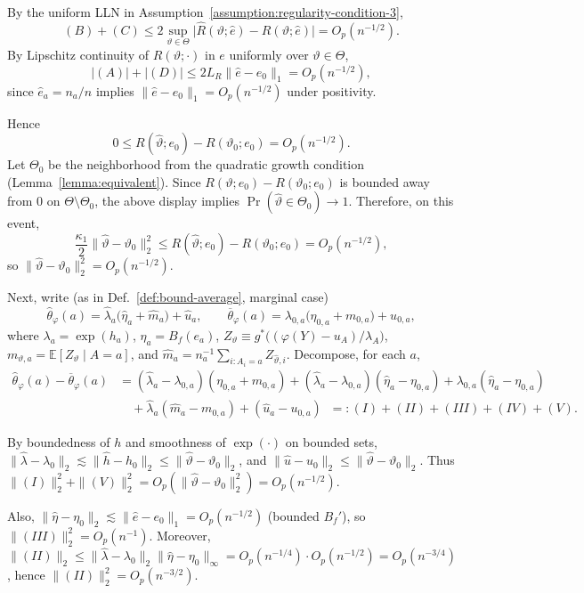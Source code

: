 By the uniform LLN in Assumption~\ref{assumption:regularity-condition-3},
\[
(B)+(C) \le 2\sup_{\vartheta\in\Theta}\big|\widehat R(\vartheta;\widehat e)-R(\vartheta;\widehat e)\big|
= O_p(n^{-1/2}).
\]
By Lipschitz continuity of $R(\vartheta;\cdot)$ in $e$ uniformly over $\vartheta\in\Theta$,
\[
|(A)|+|(D)|
\le 2L_R\|\widehat e-e_0\|_1
= O_p(n^{-1/2}),
\]
since $\widehat e_a=n_a/n$ implies $\|\widehat e-e_0\|_1=O_p(n^{-1/2})$ under positivity.

Hence
\[
0 \le R(\widehat\vartheta;e_0)-R(\vartheta_0;e_0)=O_p(n^{-1/2}).
\]
Let $\Theta_0$ be the neighborhood from the quadratic growth condition (Lemma~\ref{lemma:equivalent}).
Since $R(\vartheta;e_0)-R(\vartheta_0;e_0)$ is bounded away from $0$ on $\Theta\setminus\Theta_0$,
the above display implies $\Pr(\widehat\vartheta\in\Theta_0)\to 1$. Therefore, on this event,
\[
\frac{\kappa_1}{2}\|\widehat\vartheta-\vartheta_0\|_2^2
\le R(\widehat\vartheta;e_0)-R(\vartheta_0;e_0)
= O_p(n^{-1/2}),
\]
so $\|\widehat\vartheta-\vartheta_0\|_2^2=O_p(n^{-1/2})$.

Next, write (as in Def.~\ref{def:bound-average}, marginal case)
\[
\widehat\theta_\varphi(a)=\widehat\lambda_a\big(\widehat\eta_a+\widehat m_a\big)+\widehat u_a,
\qquad
\overline\theta_\varphi(a)=\lambda_{0,a}\big(\eta_{0,a}+m_{0,a}\big)+u_{0,a},
\]
where $\lambda_a=\exp(h_a)$, $\eta_a=B_f(e_a)$,
$Z_\vartheta \equiv g^\ast\!\big((\varphi(Y)-u_A)/\lambda_A\big)$,
$m_{\vartheta,a}=\mathbb E[Z_\vartheta\mid A=a]$, and $\widehat m_a=n_a^{-1}\sum_{i:A_i=a} Z_{\widehat\vartheta,i}$.
Decompose, for each $a$,
\begin{align*}
\widehat\theta_\varphi(a)-\overline\theta_\varphi(a)
&= (\widehat\lambda_a-\lambda_{0,a})(\eta_{0,a}+m_{0,a})
+(\widehat\lambda_a-\lambda_{0,a})(\widehat\eta_a-\eta_{0,a})
+\lambda_{0,a}(\widehat\eta_a-\eta_{0,a}) \\
&\quad+\widehat\lambda_a(\widehat m_a-m_{0,a})
+(\widehat u_a-u_{0,a})
\;\;=:(I)+(II)+(III)+(IV)+(V).
\end{align*}

By boundedness of $h$ and smoothness of $\exp(\cdot)$ on bounded sets,
$\|\widehat\lambda-\lambda_0\|_2 \lesssim \|\widehat h-h_0\|_2\le\|\widehat\vartheta-\vartheta_0\|_2$,
and $\|\widehat u-u_0\|_2\le\|\widehat\vartheta-\vartheta_0\|_2$.
Thus $\|(I)\|_2^2+\|(V)\|_2^2 = O_p(\|\widehat\vartheta-\vartheta_0\|_2^2)=O_p(n^{-1/2})$.

Also, $\|\widehat\eta-\eta_0\|_2 \lesssim \|\widehat e-e_0\|_1 = O_p(n^{-1/2})$ (bounded $B_f'$),
so $\|(III)\|_2^2=O_p(n^{-1})$.
Moreover, $\|(II)\|_2 \le \|\widehat\lambda-\lambda_0\|_2\|\widehat\eta-\eta_0\|_\infty
= O_p(n^{-1/4})\cdot O_p(n^{-1/2})=O_p(n^{-3/4})$, hence $\|(II)\|_2^2=O_p(n^{-3/2})$.

